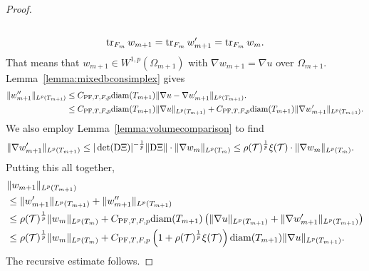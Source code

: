 \documentclass[a4paper]{article}
\begin{document}
\begin{proof}
\begin{gather*}
        \\
        \operatorname{tr}_{F_{m}} w_{m+1} = \operatorname{tr}_{F_{m}} w'_{m+1} = \operatorname{tr}_{F_{m}} w_{m}.
    \end{gather*}
    That means that $w_{m+1} \in W^{1,p}(\Omega_{m+1})$ with $\nabla w_{m+1} = \nabla u$ over $\Omega_{m+1}$. 
    Lemma~\ref{lemma:mixedbconsimplex} gives 
    \begin{align*}
        \| w''_{m+1} \|_{L^{p}(T_{m+1})} 
        &
        \leq 
        C_{{\rm PF},T,F,p} {\operatorname{diam}}(T_{m+1}) \| \nabla u - \nabla w'_{m+1} \|_{L^{p}(T_{m+1})}.
        \\&
        \leq 
        C_{{\rm PF},T,F,p} {\operatorname{diam}}(T_{m+1}) \| \nabla u        \|_{L^{p}(T_{m+1})} 
        + 
        C_{{\rm PF},T,F,p} {\operatorname{diam}}(T_{m+1}) \| \nabla w'_{m+1} \|_{L^{p}(T_{m+1})} 
        .
    \end{align*}
    We also employ Lemma~\ref{lemma:volumecomparison} to find 
    \begin{align*}
        \| \nabla w'_{m+1} \|_{L^{p}(T_{m+1})}
        &\leq 
        |\det({\mathrm D} \Xi  )|^{-\frac 1 p} 
        \| {\mathrm D} \Xi   \|
        \cdot 
        \| \nabla w_{m} \|_{L^{p}(T_{m})}
        \leq 
        \rho({\mathcal T})^{\frac 1 p} \xi({\mathcal T})
        \cdot 
        \| \nabla w_{m} \|_{L^{p}(T_{m})}
        .
    \end{align*}
    Putting this all together, 
    \begin{align*}
        &
        \| w_{m+1} \|_{L^{p}(T_{m+1})}
        \\&
        \leq  
        \| w'_{m+1} \|_{L^{p}(T_{m+1})}
        + 
        \| w''_{m+1} \|_{L^{p}(T_{m+1})}
        \\&
        \leq  
        \rho({\mathcal T})^{\frac 1 p} 
        \| w_{m} \|_{L^{p}(T_{m})} 
        + 
        C_{{\rm PF},T,F,p} {\operatorname{diam}}(T_{m+1}) 
        \left( 
            \| \nabla u \|_{L^{p}(T_{m+1})} 
            + 
            \| \nabla w'_{m+1} \|_{L^{p}(T_{m+1})} 
        \right) 
        \\&
        \leq  
        \rho({\mathcal T})^{\frac 1 p} 
        \| w_{m} \|_{L^{p}(T_{m})} 
        + 
        C_{{\rm PF},T,F,p} 
        \left( 1 + \rho({\mathcal T})^{\frac 1 p} \xi({\mathcal T}) \right) 
        {\operatorname{diam}}(T_{m+1}) 
        \| \nabla u \|_{L^{p}(T_{m+1})} 
        .
    \end{align*}
    The recursive estimate follows. 
\end{proof}
\end{document}
